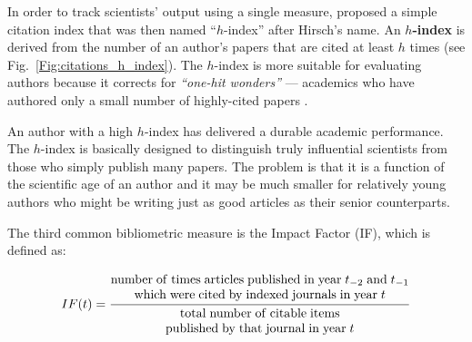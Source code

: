 \documentclass[graybox,envcountchap,sectrefs,UStrade]{svmono}
\begin{document}
In order to track scientists' output using a single measure, \citet{Hirsch2005} proposed a simple citation index that was then named ``$h$-index'' after Hirsch's name. An \textbf{$h$-index} is derived from the number of an author's papers that are cited at least $h$ times (see Fig.\@~\ref{Fig:citations_h_index}). The $h$-index is more suitable for evaluating authors because it corrects for \emph{``one-hit wonders''} --- academics who have authored only a small number of highly-cited papers \citep{Roediger2006AO,Harzing2008AM,Bar-Ilan2008scientometrics}.\par

An author with a high $h$-index has delivered a durable academic performance. The $h$-index is basically designed to distinguish truly influential scientists from those who simply publish many papers. The problem is that it is a function of the scientific age of an author and it may be much smaller for relatively young authors who might be writing just as good articles as their senior counterparts. \par

The third common bibliometric measure is the Impact Factor (IF), which is defined as:

\begin{equation}\label{E:IF}
   IF (t) = \frac{ \begin{matrix}
{\rm number} \; {\rm of} \; {\rm times} \; {\rm articles} \;  {\rm published} \; {\rm in} \; {\rm year} \; t_{-2} \; {\rm and} \; t_{-1} \\
{\rm which} \;{\rm were} \; {\rm cited} \; {\rm by} \; {\rm indexed} \; {\rm journals} \; {\rm in} \; {\rm year} \; t
\end{matrix} }{ \begin{matrix}
{\rm total} \; {\rm number} \; {\rm of} \; {\rm citable} \; {\rm items} \\
 {\rm published} \; {\rm by} \; {\rm that} \; {\rm journal} \; {\rm in} \; {\rm year} \; t
\end{matrix} }
\end{equation}
\end{document}
